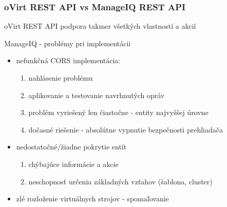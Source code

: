 \documentclass[pdf]{beamer}
\begin{document}
\begin{frame}
\frametitle{oVirt REST API vs ManageIQ REST  API}

\begin{block}{oVirt REST API} 
podpora takmer všetkých vlastností a akcií
\end{block}

\begin{block}{ManageIQ - problémy pri implementácii} 
\begin{itemize}
\item nefunkčná CORS implementácia:

\begin{enumerate}
\item nahlásenie problému
\item aplikovanie a testovanie navrhnutých opráv
\item problém vyriešený len čiastočne - entity najvyššej úrovne
\item dočasné riešenie - absolútne vypnutie bezpečnosti prehliadača
\end{enumerate}

\item nedostatočné/žiadne pokrytie entít
\begin{enumerate}
\item chýbajúce informácie a akcie
\item neschopnosť určenia základných vzťahov (šablona, cluster)
\end{enumerate}

\item zlé rozloženie virtuálnych strojov - spomaľovanie

\end{itemize}
\end{block}

\end{frame}
\end{document}
